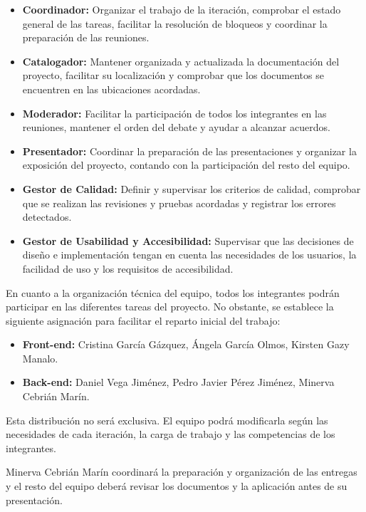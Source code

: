 \begin{itemize}
    \item \textbf{Coordinador:} Organizar el trabajo de la iteración, comprobar el estado general de las tareas, facilitar la resolución de bloqueos y coordinar la preparación de las reuniones.
    \item \textbf{Catalogador:} Mantener organizada y actualizada la documentación del proyecto, facilitar su localización y comprobar que los documentos se encuentren en las ubicaciones acordadas.
    \item \textbf{Moderador:} Facilitar la participación de todos los integrantes en las reuniones, mantener el orden del debate y ayudar a alcanzar acuerdos.
    \item \textbf{Presentador:} Coordinar la preparación de las presentaciones y organizar la exposición del proyecto, contando con la participación del resto del equipo.
    \item \textbf{Gestor de Calidad:} Definir y supervisar los criterios de calidad, comprobar que se realizan las revisiones y pruebas acordadas y registrar los errores detectados.
    \item \textbf{Gestor de Usabilidad y Accesibilidad:} Supervisar que las decisiones de diseño e implementación tengan en cuenta las necesidades de los usuarios, la facilidad de uso y los requisitos de accesibilidad.
\end{itemize}

En cuanto a la organización técnica del equipo, todos los integrantes podrán participar en las diferentes tareas del proyecto. No obstante, se establece la siguiente asignación para facilitar el reparto inicial del trabajo:

\begin{itemize}
    \item \textbf{Front-end:} Cristina García Gázquez, Ángela García Olmos, Kirsten Gazy Manalo.
    \item \textbf{Back-end:} Daniel Vega Jiménez, Pedro Javier Pérez Jiménez, Minerva Cebrián Marín.
\end{itemize}

Esta distribución no será exclusiva. El equipo podrá modificarla según las necesidades de cada iteración, la carga de trabajo y las competencias de los integrantes.

Minerva Cebrián Marín coordinará la preparación y organización de las entregas y el resto del equipo deberá revisar los documentos y la aplicación antes de su presentación.

